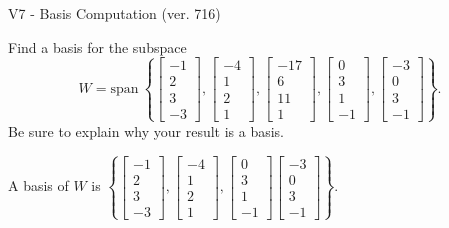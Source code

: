 \begin{exercise}
  \begin{exerciseTitle}V7 - Basis Computation (ver. 716)\end{exerciseTitle}
  \begin{exerciseStatement}
    Find a basis for the subspace 
\[W=\mathrm{span}\ \left\{\left[\begin{array}{r}
-1 \\
2 \\
3 \\
-3
\end{array}\right] , \left[\begin{array}{r}
-4 \\
1 \\
2 \\
1
\end{array}\right] , \left[\begin{array}{r}
-17 \\
6 \\
11 \\
1
\end{array}\right] , \left[\begin{array}{r}
0 \\
3 \\
1 \\
-1
\end{array}\right] , \left[\begin{array}{r}
-3 \\
0 \\
3 \\
-1
\end{array}\right]\right\}.\]
 Be sure to explain why your result is a basis.


  \end{exerciseStatement}
  \begin{exerciseAnswer}
   A basis of \(W\) is  \(\left\{\left[\begin{array}{r}
-1 \\
2 \\
3 \\
-3
\end{array}\right] , \left[\begin{array}{r}
-4 \\
1 \\
2 \\
1
\end{array}\right] , \left[\begin{array}{r}
0 \\
3 \\
1 \\
-1
\end{array}\right] \left[\begin{array}{r}
-3 \\
0 \\
3 \\
-1
\end{array}\right]\right\}\).
  


  \end{exerciseAnswer}
\end{exercise}
